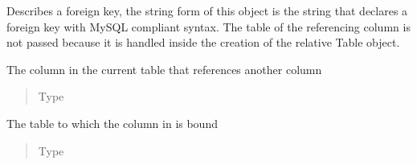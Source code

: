 \documentclass[letterpaper,10pt,english]{sphinxmanual}
\begin{document}
\begin{fulllineitems}
\label{\detokenize{model:mini_sql.model.foreign_key.ForeignKey}}
\sphinxAtStartPar
Describes a foreign key, the string form of this object is the
string that declares a foreign key with MySQL compliant syntax.
The table of the referencing column is not passed because it is
handled inside the creation of the relative Table object.

\begin{fulllineitems}
\label{\detokenize{model:mini_sql.model.foreign_key.ForeignKey.__from_column}}
\sphinxAtStartPar
The column in the current table that references another column
\begin{quote}\begin{description}
\item[{Type}] \leavevmode
\sphinxAtStartPar
{\hyperref[\detokenize{model:mini_sql.model.column.Column}]{}}

\end{description}\end{quote}

\end{fulllineitems}


\begin{fulllineitems}
\label{\detokenize{model:mini_sql.model.foreign_key.ForeignKey.__to_table}}
\sphinxAtStartPar
The table to which the column in  is bound
\begin{quote}\begin{description}
\item[{Type}] \leavevmode
\sphinxAtStartPar
{\hyperref[\detokenize{model:mini_sql.model.table.Table}]{}}


\end{description}
\end{quote}
\end{fulllineitems}
\end{fulllineitems}
\end{document}
